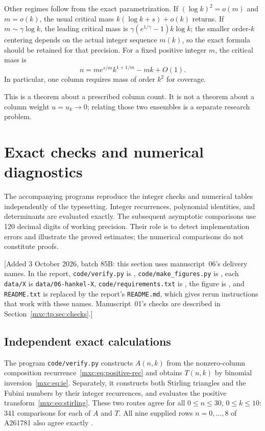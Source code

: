 \documentclass[11pt]{article}
\numberwithin{equation}{section}
\theoremstyle{definition}
\theoremstyle{remark}
\begin{document}
Other regimes follow from the exact parametrization. If
$(\log k)^2=o(m)$ and $m=o(k)$, the usual critical mass
$k(\log k+s)+o(k)$ returns. If $m\sim\gamma\log k$, the leading
critical mass is
$\gamma(e^{1/\gamma}-1)k\log k$; the smaller order-$k$ centering
depends on the actual integer sequence $m(k)$, so the exact formula
should be retained for that precision. For a fixed positive integer
$m$, the critical mass is
\[
 n=m e^{s/m}k^{1+1/m}-mk+O(1).
\]
In particular, one column requires mass of order $k^2$ for coverage.

This is a theorem about a prescribed column count. It is not a theorem
about a column weight $u=u_k\to0$; relating those two ensembles is
a separate research problem.

\section{Exact checks and numerical diagnostics}\label{mxc:sec:numerics}

The accompanying programs reproduce the integer checks and numerical
tables independently of the typesetting. Integer recurrences, polynomial
identities, and determinants are evaluated exactly. The subsequent
asymptotic comparisons use 120 decimal digits of working precision.
Their role is to detect implementation errors and illustrate the proved
estimates; the numerical comparisons do not constitute proofs.

[Added 3 October 2026, batch 85B: this section uses manuscript~06's
delivery names. In the report, \texttt{code/verify.py} is
, \texttt{code/make\_figures.py} is
, each \texttt{data/X} is
\texttt{data/06-hankel-X}, \texttt{code/requirements.txt} is
, the figure is
, and \texttt{README.txt} is
replaced by the report's \texttt{README.md}, which gives rerun
instructions that work with these names. Manuscript~01's checks are
described in Section~\ref{mxc:tp:sec:checks}.]

\subsection{Independent exact calculations}
The program \texttt{code/verify.py} constructs $A(n,k)$ from the
nonzero-column composition recurrence~\eqref{mxc:eq:positive-rec} and obtains
$T(n,k)$ by binomial inversion~\eqref{mxc:eq:ie}. Separately, it constructs
both Stirling triangles and the Fubini numbers by their integer
recurrences, and evaluates the positive transform~\eqref{mxc:eq:stirling}.
These two routes agree for all $0\le n\le30$, $0\le k\le10$:
341 comparisons for each of $A$ and $T$. All nine supplied rows
$n=0,\ldots,8$ of A261781 also agree exactly \cite{oeis781}.
\end{document}
